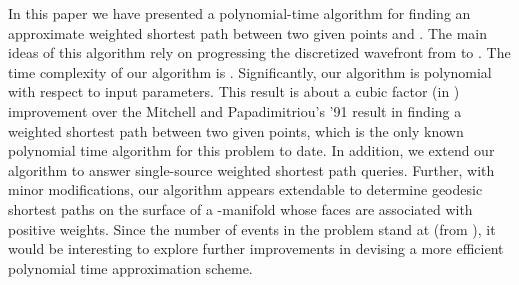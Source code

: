 \documentclass[11pt]{article}
\begin{document}
In this paper we have presented a polynomial-time algorithm for finding an approximate weighted shortest path between two given points  and .
The main ideas of this algorithm rely on progressing the discretized wavefront from  to . 
The time complexity of our algorithm is .
Significantly, our algorithm is polynomial with respect to input parameters.
This result is about a cubic factor (in ) improvement over the Mitchell and Papadimitriou's '91 result \cite{journals/jacm/MitchellP91} in finding a weighted shortest path between two given points, which is the only known polynomial time algorithm for this problem to date.
In addition, we extend our algorithm to answer single-source weighted shortest path queries.
Further, with minor modifications, our algorithm appears extendable to determine geodesic shortest paths on the surface of a -manifold whose faces are associated with positive weights. 
Since the number of events in the problem stand at  (from \cite{journals/jacm/MitchellP91}), it would be interesting to explore further improvements in devising a more efficient polynomial time approximation scheme.




\end{document}
